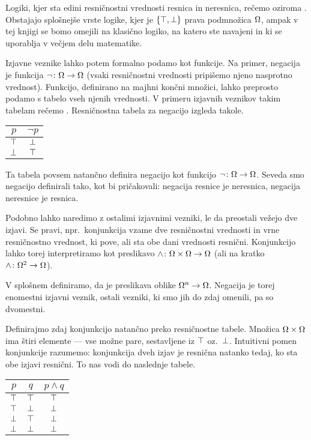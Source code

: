 		\begin{opomba}
			Logiki, kjer sta edini resničnostni vrednosti resnica in neresnica, rečemo  oziroma . Obstajajo splošnejše vrste logike, kjer je $\set{\true, \false}$ prava podmnožica $\Omega$, ampak v tej knjigi se bomo omejili na klasično logiko, na katero ste navajeni in ki se uporablja v večjem delu matematike.
		\end{opomba}
		
		Izjavne veznike lahko potem formalno podamo kot funkcije. Na primer, negacija je funkcija $\lnot\colon \Omega \to \Omega$ (vsaki resničnostni vrednosti pripišemo njeno nasprotno vrednost). Funkcijo, definirano na majhni končni množici, lahko preprosto podamo s tabelo vseh njenih vrednosti. V primeru izjavnih veznikov takim tabelam rečemo . Resničnostna tabela za negacijo izgleda takole.
		\begin{center}
			\begin{tabular}{c|c}
				$p$ & $\lnot{p}$ \\
				\hline
				$\top$ & $\bot$ \\
				$\bot$ & $\top$
			\end{tabular}
		\end{center}
		Ta tabela povsem natančno definira negacijo kot funkcijo $\lnot\colon \Omega \to \Omega$. Seveda smo negacijo definirali tako, kot bi pričakovali: negacija resnice je neresnica, negacija neresnice je resnica.
		
		Podobno lahko naredimo z ostalimi izjavnimi vezniki, le da preostali vežejo dve izjavi. Se pravi, npr.~konjunkcija vzame dve resničnostni vrednosti in vrne resničnostno vrednost, ki pove, ali sta obe dani vrednosti resnični. Konjunkcijo lahko torej interpretiramo kot preslikavo $\land\colon \Omega \times \Omega \to \Omega$ (ali na kratko $\land\colon \Omega^2 \to \Omega$).
		
		V splošnem definiramo, da je  preslikava oblike $\Omega^n \to \Omega$. Negacija je torej enomestni izjavni veznik, ostali vezniki, ki smo jih do zdaj omenili, pa so dvomestni.
		
		Definirajmo zdaj konjunkcijo natančno preko resničnostne tabele. Množica $\Omega \times \Omega$ ima štiri elemente --- vse možne pare, sestavljene iz $\top$ oz.~$\bot$. Intuitivni pomen konjunkcije razumemo: konjunkcija dveh izjav je resnična natanko tedaj, ko sta obe izjavi resnični. To nas vodi do naslednje tabele.
		\begin{center}
			\begin{tabular}{cc|c}
				$p$ & $q$ & $p \land q$ \\
				\hline
				$\top$ & $\top$ & $\top$ \\
				$\top$ & $\bot$ & $\bot$ \\
				$\bot$ & $\top$ & $\bot$ \\
				$\bot$ & $\bot$ & $\bot$
			\end{tabular}
		\end{center}
		
